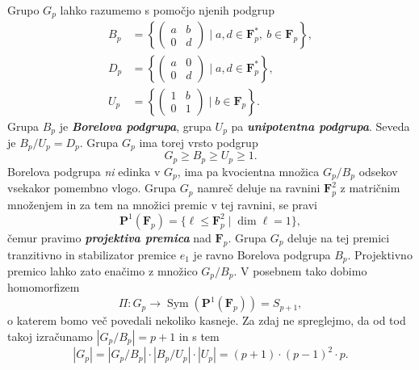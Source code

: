 \documentclass[11pt]{book}
\def\FF{\mathbf{F}}
\def\PP{\mathbf{P}}
\DeclareMathOperator\Sym{Sym}
\def\definicija{\color{rdeca}\bf\em}
\theoremstyle{definition}
\theoremstyle{zgled}
\theoremstyle{odprtproblem}
\theoremstyle{domacanaloga}
\theoremstyle{izrek}
\begin{document}
Grupo $G_p$ lahko razumemo s pomočjo njenih podgrup
\begin{align*}
    B_p &= \left\{ \begin{pmatrix} a & b \\ 0 & d \end{pmatrix} \mid a,d \in \FF_p^*, \ b \in \FF_p \right\}, \\
    D_p &= \left\{ \begin{pmatrix} a & 0 \\ 0 & d \end{pmatrix} \mid a,d \in \FF_p^* \right\}, \\
    U_p &= \left\{ \begin{pmatrix} 1 & b \\ 0 & 1 \end{pmatrix} \mid b \in \FF_p \right\}.
\end{align*}
Grupa $B_p$ je {\definicija Borelova podgrupa}, grupa $U_p$ pa {\definicija unipotentna podgrupa}. Seveda je $B_p/U_p = D_p$. Grupa $G_p$ ima torej vrsto podgrup
\[
    G_p \geq B_p \geq U_p \geq 1.
\]
Borelova podgrupa \emph{ni} edinka v $G_p$, ima pa kvocientna množica $G_p/B_p$  odsekov vsekakor pomembno vlogo. Grupa $G_p$ namreč deluje na ravnini $\FF_p^2$ z matričnim množenjem in za tem na množici premic v tej ravnini, se pravi
\[
    \PP^1(\FF_p) = \{ \ell \leq \FF_p^2 \mid \dim \ell = 1 \},
\]
čemur pravimo {\definicija projektiva premica} nad $\FF_p$. Grupa $G_p$ deluje na tej premici tranzitivno in stabilizator premice $e_1$ je ravno Borelova podgrupa $B_p$. Projektivno premico lahko zato enačimo z množico $G_p/B_p$. V posebnem tako dobimo homomorfizem 
\[
    \Pi \colon G_p \to \Sym(\PP^1(\FF_p)) = S_{p+1},
\]
o katerem bomo več povedali nekoliko kasneje. Za zdaj ne spreglejmo, da od tod takoj izračunamo $|G_p/B_p| = p+1$ in s tem 
\[
    |G_p| = |G_p/B_p| \cdot |B_p/U_p| \cdot |U_p| = (p+1) \cdot (p-1)^2 \cdot p.
\]
\end{document}
